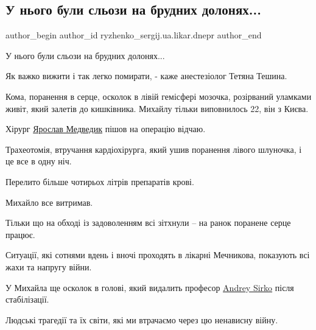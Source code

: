  
 
 
 
 
 
\subsection{У нього були сльози на брудних долонях...}
\label{sec:08_12_2022.fb.ryzhenko_sergij.ua.likar.dnepr.1.sljozy_doloni}
 
\ifcmt
 author_begin
   author_id ryzhenko_sergij.ua.likar.dnepr
 author_end
\fi

У нього були сльози на брудних долонях...

Як важко вижити і так легко помирати, - каже анестезіолог Тетяна Тешина.

Кома, поранення в серце, осколок в лівій гемісфері мозочка, розірваний уламками
живіт, який залетів до кишківника.  Михайлу тільки виповнилось 22, він з Києва.

Хірург \href{https://www.facebook.com/profile.php?id=100029563000279}{Ярослав Медведик} пішов на операцію відчаю.

Трахеотомія, втручання кардіохірурга, який ушив поранення лівого шлуночка, і це
все в одну ніч.

Перелито більше чотирьох літрів препаратів крові.

Михайло все витримав.

Тільки що на обході із задоволенням всі зітхнули – на ранок поранене серце
працює.

Ситуації, які сотнями вдень і вночі проходять в лікарні Мечникова, показують
всі жахи та напругу війни.

У Михайла ще осколок в голові, який видалить професор
\href{https://www.facebook.com/andrey.sirko.1}{Andrey Sirko} після
стабілізації.

Людські трагедії та їх світи, які ми втрачаємо через цю ненависну війну.

